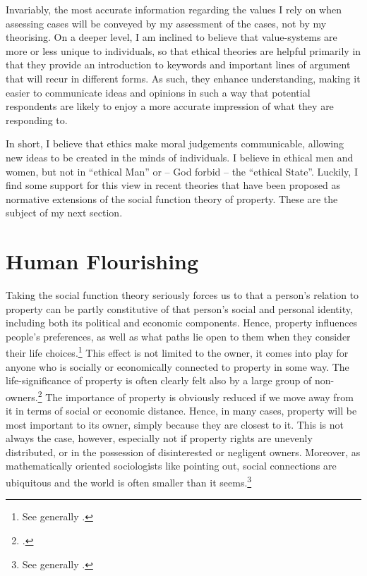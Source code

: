 {Invariably, the most accurate information regarding the values I rely on when assessing cases will be conveyed by my assessment of the cases, not by my theorising. On a deeper level, I am inclined to believe that value-systems are more or less unique to individuals, so that ethical theories are helpful primarily in that they provide an introduction to keywords and important lines of argument that will recur in different forms. As such, they enhance understanding, making it easier to communicate ideas and opinions in such a way that potential respondents are likely to enjoy a more accurate impression of what they are responding to. 

In short, I believe that ethics make moral judgements communicable, allowing new ideas to be created in the minds of individuals. I believe in ethical men and women, but not in ``ethical Man'' or -- God forbid -- the ``ethical State''. Luckily, I find some support for this view in recent theories that have been proposed as normative extensions of the social function theory of property. These are the subject of my next section.
}

\section{Human Flourishing}\label{sec:hf}

Taking the social function theory seriously forces us to  that a person's relation to property can be partly constitutive of that person's social and personal identity, including both its political and economic components. Hence, property influences people's preferences, as well as what paths lie open to them when they consider their life choices.\footnote{See generally \cite{alexander09}.} This effect is not limited to the owner, it comes into play for anyone who is socially or economically connected to property in some way. The life-significance of property is often clearly felt also by a large group of non-owners.\footcite[128-129]{alexander09d} The importance of property is obviously reduced if we move away from it in terms of social or economic distance. Hence, in many cases, property will be most important to its owner, simply because they are closest to it. This is not always the case, however, especially not if property rights are unevenly distributed, or in the possession of disinterested or negligent owners. Moreover, as mathematically oriented sociologists like pointing out, social connections are ubiquitous and the world is often smaller than it seems.\footnote{See generally \cite{schnettler09}.}

